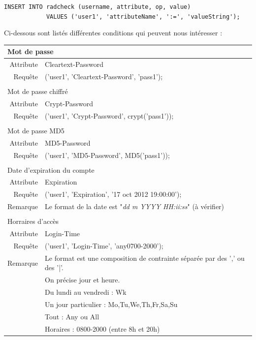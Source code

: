 \begin{verbatim}
INSERT INTO radcheck (username, attribute, op, value)
            VALUES ('user1', 'attributeName', ':=', 'valueString');
\end{verbatim}

Ci-dessous sont listés différentes conditions qui peuvent nous intéresser :

\begin{tabular}{rl}
  \multicolumn{2}{l}{Mot de passe} \\
  \hline
  Attribute & Cleartext-Password \\
  Requête & ('user1', 'Cleartext-Password', 'pass1'); \\
  \\
  \multicolumn{2}{l}{Mot de passe chiffré} \\
  \hline
  Attribute & Crypt-Password \\
  Requête & ('user1', 'Crypt-Password', crypt('pass1')); \\
  \\
  \multicolumn{2}{l}{Mot de passe MD5} \\
  \hline
  Attribute & MD5-Password \\
  Requête & ('user1', 'MD5-Password', MD5('pass1')); \\
  \\
	\multicolumn{2}{l}{Date d'expiration du compte} \\
  \hline
  Attribute & Expiration \\
  Requête & ('user1', 'Expiration', '17 oct 2012 19:00:00'); \\
	Remarque & Le format de la date est "\textit{dd m YYYY HH:ii:ss}" (à vérifier) \\
	\\
	\multicolumn{2}{l}{Horraires d'accès} \\
  \hline
  Attribute & Login-Time \\
  Requête & ('user1', 'Login-Time', 'any0700-2000'); \\
	Remarque & Le format est une composition de contrainte séparée par des ',' ou des '|'. \\
					 & On précise jour et heure. \\
					 & Du lundi au vendredi : Wk \\
					 & Un jour particulier : Mo,Tu,We,Th,Fr,Sa,Su \\
					 & Tout : Any ou All \\
					 & Horaires : 0800-2000 (entre 8h et 20h) \\

\end{tabular}
